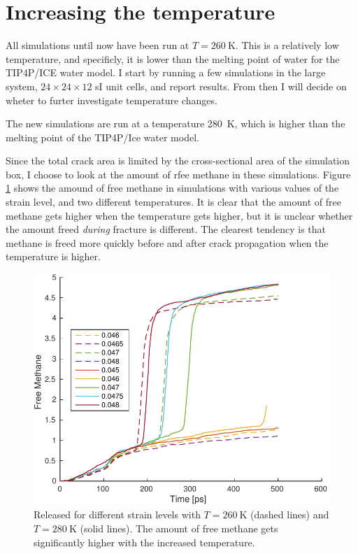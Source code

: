 \section{Increasing the temperature}
All simulations until now have been run at $T=\SI{260}{\kelvin}$. This is a relatively low temperature, and specificly, it is lower than the melting point of water for the TIP4P/ICE water model. I start by running a few simulations in the large system, $24\times 24\times 12$ sI unit cells, and report results. From then I will decide on wheter to furter investigate temperature changes.

The new simulations are run at a temperature \SI{280}{\kelvin}, which is higher than the melting point of the TIP4P/Ice water model. 

Since the total crack area is limited by the cross-sectional area of the simulation box, I choose to look at the amount of rfee methane in these simulations. Figure \ref{fig:released_methane_temp} shows the amound of free methane in simulations with various values of the strain level, and two different temperatures. It is clear that the amount of free methane gets higher when the temperature gets higher, but it is unclear whether the amount freed \emph{during} fracture is different. The clearest tendency is that methane is freed more quickly before and after crack propagation when the temperature is higher. 

\begin{figure}
\centering
\includegraphics[width=12cm]{../figures/thesis/released_methane_temp.pdf}
\caption{Released for different strain levels with $T = \SI{260}{\kelvin}$ (dashed lines) and $T = \SI{280}{\kelvin}$ (solid lines). The amount of free methane gets significantly higher with the increased temperature.}
\label{fig:released_methane_temp}
\end{figure}


